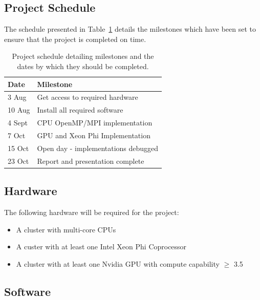 \documentclass[10pt,twocolumn]{article}
\begin{document}
\subsection{Project Schedule}
The schedule presented in Table~\ref{tab:sched} details the milestones which have been set to ensure that the 
project is completed on time.
\begin{table}[t!]
    \small
    \centering
    \caption{Project schedule detailing milestones and the dates by which they should be completed.}
    \label{tab:sched}
    \vspace{0.2cm}
    \begin{tabular}{l l}
        \hline  
        Date    & Milestone                                                         \\
        \hline
        \hline
        3 Aug   & Get access to required hardware                                   \\
        10 Aug  & Install all required software                                     \\
        4 Sept  & CPU OpenMP/MPI implementation                                     \\
        7 Oct   & GPU and Xeon Phi Implementation                                   \\
        15 Oct  & Open day - implementations debugged                               \\
        23 Oct  & Report and presentation complete                                  \\\hline
    \end{tabular}
\end{table}
\subsection{Hardware} \label{ssec:hware}

The following hardware will be required for the project:
\begin{itemize}[noitemsep]
    \item{A cluster with multi-core CPUs}
    \item{A custer with at least one Intel Xeon Phi Coprocessor}
    \item{A cluster with at least one Nvidia GPU with compute capability $\ge$ 3.5}
\end{itemize}

\subsection{Software} \label{ssec:sware}
\end{document}
